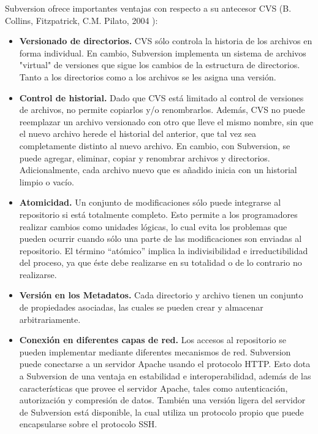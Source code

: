 \documentclass[a4paper,12pt]{article}
\begin{document}
{\begin{itemize}
\begin{figure}[h]
	\end{figure}
	\newpage	
	Subversion ofrece importantes ventajas con respecto a su antecesor CVS (B. Collins, Fitzpatrick, C.M. Pilato,  2004 ):	
	\begin{itemize}
		\item \textbf{Versionado de directorios.}  CVS sólo controla la
		historia de los archivos en forma individual. En
		cambio, Subversion implementa un sistema de
		archivos "virtual" de versiones que sigue los
		cambios de la estructura de directorios. Tanto a
		los directorios como a los archivos se les asigna
		una versión.
		
		
		\item \textbf{Control de historial.}  
		 Dado que CVS está limitado
		al control de versiones de archivos, no permite
		copiarlos y/o renombrarlos. Además, CVS no
		puede reemplazar un archivo versionado con otro
		que lleve el mismo nombre, sin que el nuevo
		archivo herede el historial del anterior, que tal vez
		sea completamente distinto al nuevo archivo. En
		cambio, con Subversion, se puede agregar,
		eliminar, copiar y renombrar archivos y directorios.
		Adicionalmente, cada archivo nuevo que es
		añadido inicia con un historial limpio o vacío.
		
		\item \textbf{Atomicidad.}  
		 Un conjunto de modificaciones sólo
		puede integrarse al repositorio si está totalmente
		completo. Esto permite a los programadores
		realizar cambios como unidades lógicas, lo cual
		evita los problemas que pueden ocurrir cuando
		sólo una parte de las modificaciones son enviadas
		al repositorio. El término “atómico” implica la
		indivisibilidad e irreductibilidad del proceso, ya que
		éste debe realizarse en su totalidad o de lo
		contrario no realizarse.
		
		\item \textbf{Versión en los Metadatos.} Cada directorio y
		archivo tienen un conjunto de propiedades
		asociadas, las cuales se pueden crear y
		almacenar arbitrariamente.
		
		
		\item \textbf{Conexión en diferentes capas de red.} 
		 Los
		accesos al repositorio se pueden implementar
		mediante diferentes mecanismos de red.
		Subversion puede conectarse a un servidor
		Apache usando el protocolo HTTP. Esto dota a
		Subversion de una ventaja en estabilidad e
		interoperabilidad, además de las características
		que provee el servidor Apache, tales como
		autenticación, autorización y compresión de datos.
		También una versión ligera del servidor de
		Subversion está disponible, la cual utiliza un
		protocolo propio que puede encapsularse sobre el
		protocolo SSH.
		

\end{itemize}
\end{itemize}}
\end{document}
